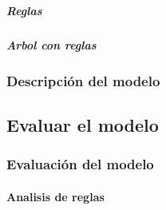         \subparagraph{Reglas}
            

        \newpage
        \subparagraph{Arbol con reglas}

            \begin{figure}[ht]
            \end{figure}
            \FloatBarrier
            \newpage

    \subsubsection{Descripción del modelo}
\subsection{Evaluar el modelo}
    \subsubsection{Evaluación del modelo}
        \paragraph{Analisis de reglas}


